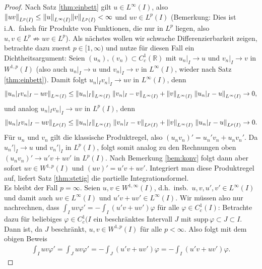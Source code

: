 \documentclass[twoside]{article}
\theoremstyle{definition}
\begin{document}
\begin{proof}
Nach Satz \ref{thm:einbett} gilt $u \in L^\infty(I)$, also $\norm{uv}_{L^p(I)} \leq \norm{u}_{L^\infty(I)} \norm{v}_{L^p(I)} < \infty$ und $uv \in L^p(I)$ (Bemerkung: Dies ist i.A.\ falsch für Produkte von Funktionen, die nur in $L^p$ liegen, also $u,v \in L^p \not \Rightarrow uv \in L^p$). Als nächstes wollen wir schwache Differenzierbarkeit zeigen, betrachte dazu zuerst $p \in [1,\infty)$ und nutze für diesen Fall ein Dichtheitsargument: Seien $(u_n),(v_n) \subset C_c^1(\mathbb{R})$ mit $u_n|_I \to u$ und $v_n|_I \to v$ in $W^{1,p}(I)$ (also auch $u_n|_I \to u$ und $v_n|_I \to v$ in $L^\infty(I)$, wieder nach Satz \ref{thm:einbett}). Damit folgt $u_n|_I  v_n|_I \to uv$ in $L^\infty(I)$, denn 
\begin{align*}
\norm{u_n|_I  v_n|_I - uv}_{L^\infty(I)} \leq \norm{u_n|_I}_{L^\infty(I)} \;  \norm{v_n|_I - v}_{L^\infty(I)} + \norm{v}_{L^\infty(I)} \; \norm{u_n|_I - u}_{L^\infty(I)} \to 0,
\end{align*}
und analog $u_n|_I  v_n|_I \to uv$ in $L^p(I)$, denn
\begin{align*}
\norm{u_n|_I  v_n|_I - uv}_{L^p(I)} \leq \norm{u_n|_I}_{L^\infty(I)}  \; \norm{v_n|_I - v}_{L^p(I)} + \norm{v}_{L^\infty(I)} \; \norm{u_n|_I - u}_{L^p(I)} \to 0.
\end{align*}
Für $u_n$ und $v_n$ gilt die klassische Produktregel, also $(u_n v_n)' = u_n' v_n + u_n v_n'$. Da $u_n'|_I \to u$ und $v_n'|_I$ in $L^p(I)$, folgt somit analog zu den Rechnungen oben $(u_n v_n)' \to u' v + u v'$ in $L^p(I)$. Nach Bemerkung \ref{bem:konv} folgt dann aber sofort $uv \in W^{1,p}(I)$ und $(uv)' = u' v + u v'$. Integriert man diese Produktregel auf, liefert Satz \ref{thm:stetig} die partielle Integrationsformel.\\

Es bleibt der Fall $p = \infty$. Seien $u,v \in W^{1,\infty}(I)$, d.h.\ insb.\ $u,v,u',v' \in L^\infty(I)$ und damit auch $uv \in L^\infty(I)$ und $u'v+uv' \in L^\infty(I)$. Wir müssen also nur nachrechnen, dass $\int_I u v \varphi' = - \int_I (u'v+uv')\varphi$ für alle $\varphi \in C_c^1(I)$: Betrachte dazu für beliebiges $\varphi \in C_c^1(I$ ein beschränktes Intervall $J$ mit $\text{supp}\, \varphi \subset J \subset I$. Dann ist, da $J$ beschränkt, $u,v \in W^{1,p}(I)$ für alle $p < \infty$. Also folgt mit dem obigen Beweis
\begin{align*}
\int_I u v \varphi' = \int_J u v \varphi' = -\int_J (u'v+uv') \varphi = -\int_I (u'v+uv') \varphi.
\end{align*}
\end{proof}
\end{document}
